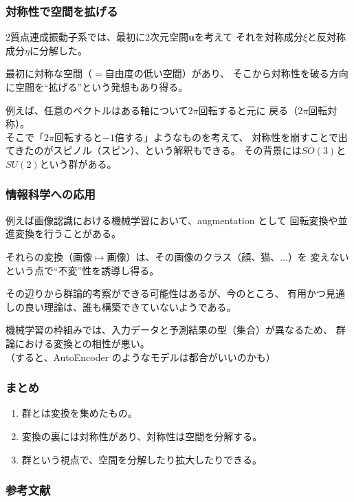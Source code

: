 \documentclass[12pt, t]{beamer}
\begin{document}
\begin{frame}
\frametitle{対称性で空間を拡げる}
$2$質点連成振動子系では、最初に$2$次元空間$\bm{u}$を考えて
それを対称成分$\xi$と反対称成分$\eta$に分解した。

最初に対称な空間（$=$自由度の低い空間）があり、
そこから対称性を破る方向に空間を``拡げる''という発想もあり得る。

例えば、任意のベクトルはある軸について$2\pi$回転すると元に
戻る（$2\pi$回転対称）。\\
そこで「$2\pi$回転すると$-1$倍する」ようなものを考えて、
対称性を崩すことで出てきたのがスピノル（スピン）、という解釈もできる。
その背景には$SO(3)$と$SU(2)$という群がある。
\end{frame}

\begin{frame}
\frametitle{情報科学への応用}
例えば画像認識における機械学習において、augmentation として
回転変換や並進変換を行うことがある。

それらの変換（画像$\mapsto$画像）は、その画像のクラス（顔、猫、$\ldots$）を
変えないという点で``不変''性を誘導し得る。

その辺りから群論的考察ができる可能性はあるが、今のところ、
有用かつ見通しの良い理論は、誰も構築できていないようである。

機械学習の枠組みでは、入力データと予測結果の型（集合）が異なるため、
群論における変換との相性が悪い。\\
（すると、AutoEncoder のようなモデルは都合がいいのかも）
\end{frame}

\begin{frame}
\frametitle{まとめ}
\begin{enumerate}
\item 群とは変換を集めたもの。
\item 変換の裏には対称性があり、対称性は空間を分解する。
\item 群という視点で、空間を分解したり拡大したりできる。
\end{enumerate}
\end{frame}

\begin{frame}
\frametitle{参考文献}
\printbibliography
\end{frame}
\end{document}
